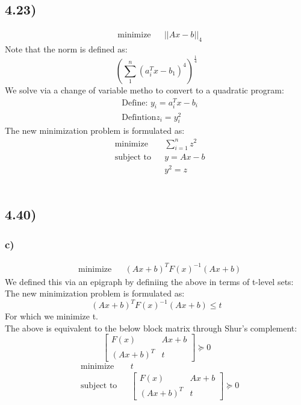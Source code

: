 \documentclass[12pt]{article}
\begin{document}
\subsection*{4.23)}

\begin{equation*}
\begin{aligned}
& {\text{minimize}}
& & ||Ax-b||_4
\end{aligned}
\end{equation*}
Note that the norm is defined as:
$$
(\sum_{1}^{n}(a_i^Tx-b_1)^4)^{\frac{1}{4}}
$$
We solve via a change of variable metho to convert to a quadratic program:
\begin{equation*}
\begin{aligned}
& \text{Define: } y_i = a_i^Tx-b_i\\
& \text{Defintion} z_i = y_i^2
\end{aligned}
\end{equation*}
The new minimization problem is formulated as:
\begin{equation*}
\begin{aligned}
& {\text{minimize}}
& & \sum^{n}_{i=1}z^2\\
& \text{subject to}
& & y = Ax-b\\
&&& y^2 = z 
\end{aligned}
\end{equation*}\

\subsection*{4.40)}

\subsubsection*{c)}

\begin{equation*}
\begin{aligned}
& {\text{minimize}}
& & (Ax+b)^TF(x)^{-1}(Ax+b)
\end{aligned}
\end{equation*}
We defined this via an epigraph by definiing the above in terms of t-level sets:
The new minimization problem is formulated as:
$$
(Ax+b)^TF(x)^{-1}(Ax+b) \le t
$$
For which we minimize t.\\
The above is equivalent to the below block matrix through Shur's complement:
$$ 
\begin{bmatrix}
F(x) & Ax+b \\
(Ax+b)^T & t
\end{bmatrix} \succeq 0
$$
\begin{equation*}
\begin{aligned}
& {\text{minimize}}
& & t\\
& \text{subject to}
& & \begin{bmatrix}
F(x) & Ax+b \\
(Ax+b)^T & t
\end{bmatrix} \succeq 0
\end{aligned}
\end{equation*}
\end{document}
